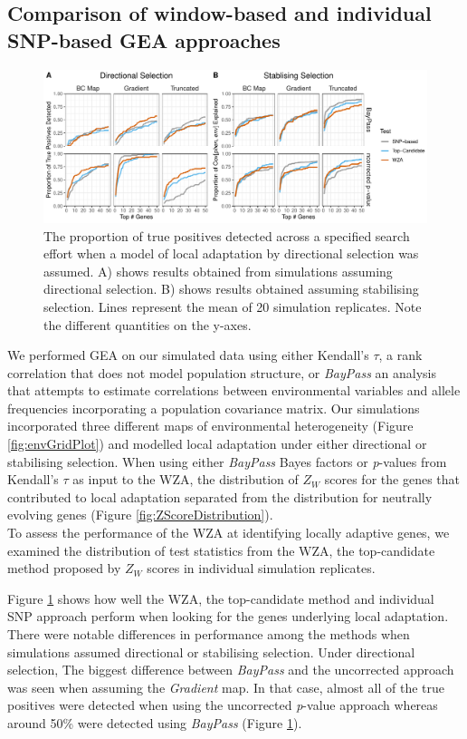 \documentclass[10pt,twoside,lineno, twocolumn]{GSA_format}
\begin{document}
\subsection{Comparison of window-based and individual SNP-based GEA approaches}


\begin{figure}
  \includegraphics[width=0.6\linewidth]{Plots/UncorrectedBayPassComparison_TruePositives.pdf} 
  \caption{The proportion of true positives detected across a specified search effort when a model of local adaptation  by directional selection was assumed. A) shows results obtained from simulations assuming directional selection. B) shows results obtained assuming stabilising selection. Lines represent the mean of 20 simulation replicates. Note the different quantities on the y-axes.}

  \label{fig:truePosBoth}
\end{figure}

We performed GEA on our simulated data using either Kendall's $\tau$, a rank correlation that does not model population structure, or \textit{BayPass} an analysis that attempts to estimate correlations between environmental variables and allele frequencies incorporating a population covariance matrix. Our simulations incorporated three different maps of environmental heterogeneity (Figure \ref{fig:envGridPlot}) and modelled local adaptation under either directional or stabilising selection. When using either \textit{BayPass} Bayes factors or \textit{p}-values from Kendall's $\tau$ as input to the WZA, the distribution of $Z_W$ scores for the genes that contributed to local adaptation separated from the distribution for neutrally evolving genes (Figure \ref{fig:ZScoreDistribution}). \\

To assess the performance of the WZA at identifying locally adaptive genes, we examined the distribution of test statistics from the WZA, the top-candidate method proposed by \citep{Yeaman2016}$Z_W$ scores in individual simulation replicates.



Figure \ref{fig:truePosBoth} shows how well the WZA, the top-candidate method and individual SNP approach perform when looking for the genes underlying local adaptation. There were notable differences in performance among the methods when simulations assumed directional or stabilising selection. Under directional selection, 
The biggest difference between \textit{BayPass} and the uncorrected approach was seen when assuming the \textit{Gradient} map. In that case, almost all of the true positives were detected when using the uncorrected \textit{p}-value approach whereas around 50\% were detected using \textit{BayPass} (Figure \ref{fig:truePosBoth}). \\
\end{document}
